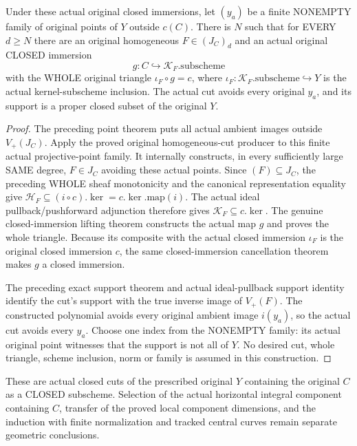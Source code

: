 \begin{theorem}
\label{thm:pl-gauss-original-closed-cut-through-subscheme}
\leanok
Under these actual original closed immersions, let $(y_a)$ be a finite
NONEMPTY family of original points of $Y$ outside $c(C)$. There is $N$
such that for EVERY $d\ge N$ there are an original homogeneous
$F\in(J_C)_d$ and an actual original CLOSED immersion
\[
 g:C\hookrightarrow\mathcal K_F.\mathrm{subscheme}
\]
with the WHOLE original triangle $\iota_F\circ g=c$, where
$\iota_F:\mathcal K_F.\mathrm{subscheme}\hookrightarrow Y$ is the actual
kernel-subscheme inclusion. The actual cut avoids every original $y_a$,
and its support is a proper closed subset of the original $Y$.
\end{theorem}
\begin{proof}
The preceding point theorem puts all actual ambient images outside
$V_+(J_C)$. Apply the proved original homogeneous-cut producer to this
finite actual projective-point family. It internally constructs, in
every sufficiently large SAME degree, $F\in J_C$ avoiding these actual
points. Since $(F)\subseteq J_C$, the preceding WHOLE sheaf monotonicity
and the canonical representation equality give
$\mathcal H_F\subseteq(i\circ c).\ker=c.\ker.\mathrm{map}(i)$.
The actual ideal pullback/pushforward adjunction therefore gives
$\mathcal K_F\subseteq c.\ker$. The genuine closed-immersion lifting
theorem constructs the actual map $g$ and proves the whole triangle.
Because its composite with the actual closed immersion $\iota_F$ is
the original closed immersion $c$, the same closed-immersion cancellation
theorem makes $g$ a closed immersion.

The preceding exact support theorem and actual ideal-pullback support
identity identify the cut's support with the true inverse image of
$V_+(F)$. The constructed polynomial avoids every original ambient
image $i(y_a)$, so the actual cut avoids every $y_a$. Choose one index
from the NONEMPTY family: its actual original point witnesses that the
support is not all of $Y$. No desired cut, whole triangle, scheme
inclusion, norm or family is assumed in this construction.
\end{proof}

These are actual closed cuts of the prescribed original $Y$ containing
the original $C$ as a CLOSED subscheme. Selection of the actual
horizontal integral component containing $C$, transfer of the proved
local component dimensions, and the induction with finite normalization
and tracked central curves remain separate geometric conclusions.
